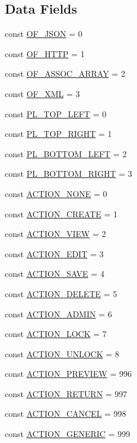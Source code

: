 \subsection*{Data Fields}
\begin{DoxyCompactItemize}
\item 
const \hyperlink{interfaceIXLUIHelper_ae216f8dc124162fce9c831581cccad38}{OF\_\-JSON} = 0
\item 
const \hyperlink{interfaceIXLUIHelper_ad861d7e1882caed33177c62354962537}{OF\_\-HTTP} = 1
\item 
const \hyperlink{interfaceIXLUIHelper_a9976081cc6341d651113d98adf880a7c}{OF\_\-ASSOC\_\-ARRAY} = 2
\item 
const \hyperlink{interfaceIXLUIHelper_a3a27aba2d308cba737ac8177f210b547}{OF\_\-XML} = 3
\item 
const \hyperlink{interfaceIXLUIHelper_ac77237b0fcb9d6540fca4eb80f4487f8}{PL\_\-TOP\_\-LEFT} = 0
\item 
const \hyperlink{interfaceIXLUIHelper_ab2d49310ee456748bb800d490fcc9e89}{PL\_\-TOP\_\-RIGHT} = 1
\item 
const \hyperlink{interfaceIXLUIHelper_a01a4f4dcd309a862d2489734b17b6d29}{PL\_\-BOTTOM\_\-LEFT} = 2
\item 
const \hyperlink{interfaceIXLUIHelper_ac1425b823028e19f350a752e8bb08000}{PL\_\-BOTTOM\_\-RIGHT} = 3
\item 
const \hyperlink{interfaceIXLUIHelper_a14ebb74e919040ff6ae640a85e26ad80}{ACTION\_\-NONE} = 0
\item 
const \hyperlink{interfaceIXLUIHelper_a9c06ab2db927f3b687a12bf1bed808cd}{ACTION\_\-CREATE} = 1
\item 
const \hyperlink{interfaceIXLUIHelper_a264a8a0ead2c258c6ad9ce0f0968cd1b}{ACTION\_\-VIEW} = 2
\item 
const \hyperlink{interfaceIXLUIHelper_ab9acf282db5918a797e09e1fa108ae9e}{ACTION\_\-EDIT} = 3
\item 
const \hyperlink{interfaceIXLUIHelper_a4f9b91b9d04c6c9d7b6ebb8ceb70c0c0}{ACTION\_\-SAVE} = 4
\item 
const \hyperlink{interfaceIXLUIHelper_a274e654ac39438f682f6bf1eb450395e}{ACTION\_\-DELETE} = 5
\item 
const \hyperlink{interfaceIXLUIHelper_a40afbdc229854c77e24353b459713784}{ACTION\_\-ADMIN} = 6
\item 
const \hyperlink{interfaceIXLUIHelper_af1b57d540e52e105bcb81d4482546cba}{ACTION\_\-LOCK} = 7
\item 
const \hyperlink{interfaceIXLUIHelper_ae24b4d0d3bf45c296468bccbfb12a13b}{ACTION\_\-UNLOCK} = 8
\item 
const \hyperlink{interfaceIXLUIHelper_a4bd6b76d55b3a5f5cecaaf7489dbcd88}{ACTION\_\-PREVIEW} = 996
\item 
const \hyperlink{interfaceIXLUIHelper_a6954c10c63953015a160f802f79e59d2}{ACTION\_\-RETURN} = 997
\item 
const \hyperlink{interfaceIXLUIHelper_a03e2e4af94065db773598c46a3d457f8}{ACTION\_\-CANCEL} = 998
\item 
const \hyperlink{interfaceIXLUIHelper_ab18109cf2120c7f61450d656a4700fff}{ACTION\_\-GENERIC} = 999
\end{DoxyCompactItemize}


